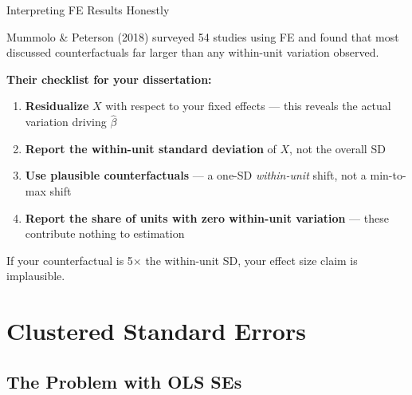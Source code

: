 \documentclass[9pt,aspectratio=169]{beamer}
\begin{document}
\begin{frame}{Interpreting FE Results Honestly}

Mummolo \& Peterson (2018) surveyed 54 studies using FE and found that most discussed counterfactuals far larger than any within-unit variation observed.

\bigskip

\textbf{Their checklist for your dissertation:}

\medskip

\begin{enumerate}
    \item \textbf{Residualize} $X$ with respect to your fixed effects --- this reveals the actual variation driving $\hat{\beta}$
    \item \textbf{Report the within-unit standard deviation} of $X$, not the overall SD
    \item \textbf{Use plausible counterfactuals} --- a one-SD \textit{within-unit} shift, not a min-to-max shift
    \item \textbf{Report the share of units with zero within-unit variation} --- these contribute nothing to estimation
\end{enumerate}

\bigskip

\begin{warningbox}
\centering
If your counterfactual is 5$\times$ the within-unit SD, your effect size claim is implausible.
\end{warningbox}

\end{frame}


\section{Clustered Standard Errors}
\subsection{The Problem with OLS SEs}
\end{document}

